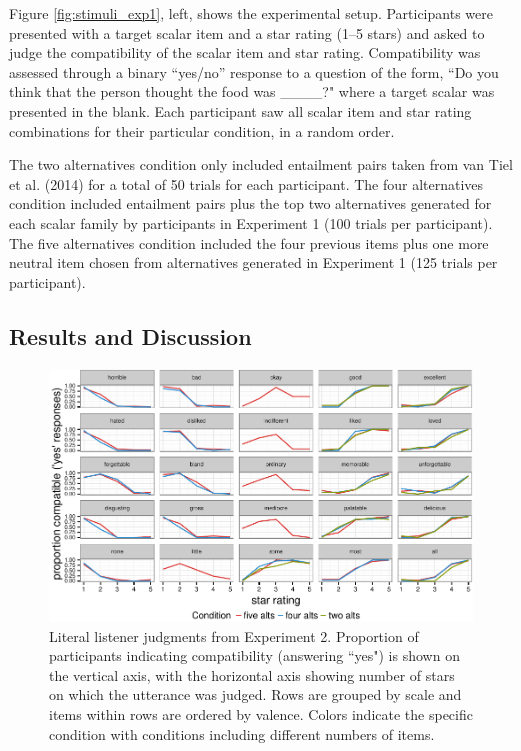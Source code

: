 \documentclass[10pt, letterpaper]{article}
\newenvironment{CodeChunk}{}{}
\begin{document}
Figure \ref{fig:stimuli_exp1}, left, shows the experimental setup.
Participants were presented with a target scalar item and a star rating
(1--5 stars) and asked to judge the compatibility of the scalar item and
star rating. Compatibility was assessed through a binary ``yes/no''
response to a question of the form, ``Do you think that the person
thought the food was \_\_\_\_?" where a target scalar was presented in
the blank. Each participant saw all scalar item and star rating
combinations for their particular condition, in a random order.

The two alternatives condition only included entailment pairs taken from
van Tiel et al. (2014) for a total of 50 trials for each participant.
The four alternatives condition included entailment pairs plus the top
two alternatives generated for each scalar family by participants in
Experiment 1 (100 trials per participant). The five alternatives
condition included the four previous items plus one more neutral item
chosen from alternatives generated in Experiment 1 (125 trials per
participant).

\subsection{Results and Discussion}\label{results-and-discussion-1}

\begin{CodeChunk}
\begin{figure}[t]

{\centering \includegraphics{figs/exp1Plots-1} 

}

\caption[Literal listener judgments from Experiment 2]{Literal listener judgments from Experiment 2. Proportion of participants indicating compatibility (answering ``yes") is shown on the vertical axis, with the horizontal axis showing number of stars on which the utterance was judged. Rows are grouped by scale and items within rows are ordered by valence. Colors indicate the specific condition with conditions including different numbers of items.}\label{fig:exp1Plots}
\end{figure}
\end{CodeChunk}
\end{document}
